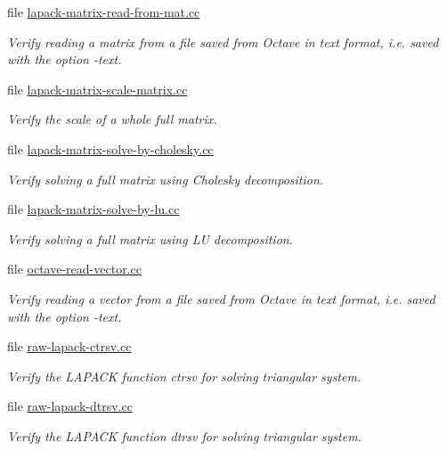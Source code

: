 \begin{DoxyCompactItemize}
file \hyperlink{lapack-matrix-read-from-mat_8cc}{lapack-\/matrix-\/read-\/from-\/mat.\+cc}
\begin{DoxyCompactList}\small\item\em Verify reading a matrix from a file saved from Octave in text format, i.\+e. saved with the option {\ttfamily -\/text}. \end{DoxyCompactList}\item 
file \hyperlink{lapack-matrix-scale-matrix_8cc}{lapack-\/matrix-\/scale-\/matrix.\+cc}
\begin{DoxyCompactList}\small\item\em Verify the scale of a whole full matrix. \end{DoxyCompactList}\item 
file \hyperlink{lapack-matrix-solve-by-cholesky_8cc}{lapack-\/matrix-\/solve-\/by-\/cholesky.\+cc}
\begin{DoxyCompactList}\small\item\em Verify solving a full matrix using Cholesky decomposition. \end{DoxyCompactList}\item 
file \hyperlink{lapack-matrix-solve-by-lu_8cc}{lapack-\/matrix-\/solve-\/by-\/lu.\+cc}
\begin{DoxyCompactList}\small\item\em Verify solving a full matrix using LU decomposition. \end{DoxyCompactList}\item 
file \hyperlink{octave-read-vector_8cc}{octave-\/read-\/vector.\+cc}
\begin{DoxyCompactList}\small\item\em Verify reading a vector from a file saved from Octave in text format, i.\+e. saved with the option {\ttfamily -\/text}. \end{DoxyCompactList}\item 
file \hyperlink{raw-lapack-ctrsv_8cc}{raw-\/lapack-\/ctrsv.\+cc}
\begin{DoxyCompactList}\small\item\em Verify the L\+A\+P\+A\+CK function {\ttfamily ctrsv} for solving triangular system. \end{DoxyCompactList}\item 
file \hyperlink{raw-lapack-dtrsv_8cc}{raw-\/lapack-\/dtrsv.\+cc}
\begin{DoxyCompactList}\small\item\em Verify the L\+A\+P\+A\+CK function {\ttfamily dtrsv} for solving triangular system. \end{DoxyCompactList}\item 

\end{DoxyCompactItemize}
